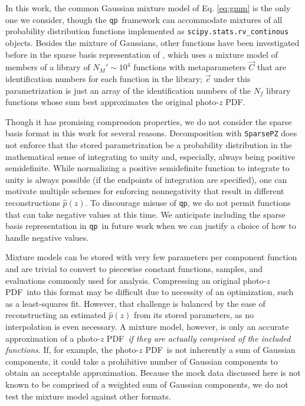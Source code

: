 \documentclass[\docopts]{\docclass}
\newcommand{\qp}{\texttt{qp}}
\newcommand{\pz}{photo-$z$ PDF}
\begin{document}
In this work, the common Gaussian mixture model of Eq. \ref{eq:gmm} is the only 
one we consider, though the \qp\ framework can accommodate mixtures of all 
probability distribution functions implemented as 
\texttt{scipy.stats.rv\_continous} objects.  Besides the mixture of Gaussians, 
other functions have been investigated before in the sparse basis 
representation of \citet{carrasco_kind_sparse_2014}, which uses a mixture model 
of members of a library of $N_{M}'\sim10^{4}$ functions with metaparameters 
$\vec{C}$ that are identification numbers for each function in the library; 
$\vec{c}$ under this parametrization is just an array of the identification 
numbers of the $N_{f}$ library functions whose sum best approximates the 
original \pz.

Though it has promising compression properties, we do not consider the sparse 
basis format in this work for several reasons.  Decomposition with 
\texttt{SparsePZ} does not enforce that the stored parametrization be a 
probability distribution in the mathematical sense of integrating to unity and, 
especially, always being positive semidefinite.  While normalizing a positive 
semidefinite function to integrate to unity is always possible (if the 
endpoints of integration are specified), one can motivate multiple schemes for 
enforcing nonnegativity that result in different reconstructions $\hat{p}(z)$.  
To discourage misuse of \qp, we do not permit functions that can take negative 
values at this time.
We anticipate including the sparse basis representation in \qp\ in future work 
when we can justify a choice of how to handle negative values.


Mixture models can be stored with very few parameters per component function 
and are trivial to convert to piecewise constant functions, samples, and 
evaluations commonly used for analysis.  Compressing an original \pz\ into this 
format may be difficult due to necessity of an optimization, such as a 
least-squares fit.  However, that challenge is balanced by the ease of 
reconstructing an estimated $\hat{p}(z)$ from its stored parameters, as no 
interpolation is even necessary.  A mixture model, however, is only an accurate 
approximation of a \pz\ \textit{if they are actually comprised of the included 
functions}.  If, for example, the \pz\ is not inherently a sum of Gaussian 
components, it could take a prohibitive number of Gaussian components to obtain 
an acceptable approximation.  Because the mock data discussed here is not known 
to be comprised of a weighted sum of Gaussian components, we do not test the 
mixture model against other formats.
\end{document}
